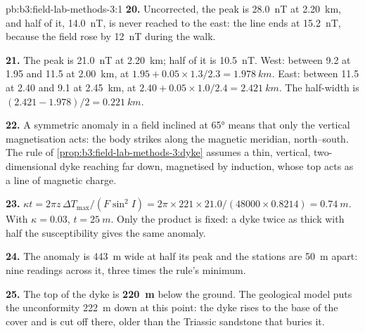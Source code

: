\begin{solution}{pb:b3:field-lab-methods-3:1}
\textbf{20.} Uncorrected, the peak is \qty{28.0}{nT} at \qty{2.20}{km}, and
half of it, \qty{14.0}{nT}, is never reached to the east: the line ends
at \qty{15.2}{nT}, because the field rose by \qty{12}{nT} during the
walk.

\textbf{21.} The peak is \qty{21.0}{nT} at \qty{2.20}{km}; half of it is
\qty{10.5}{nT}. West: between \num{9.2} at \num{1.95} and \num{11.5} at
\qty{2.00}{km}, at $1.95 + 0.05\times1.3/2.3 = \qty{1.978}{km}$. East:
between \num{11.5} at \num{2.40} and \num{9.1} at \qty{2.45}{km}, at
$2.40 + 0.05\times1.0/2.4 = \qty{2.421}{km}$. The half-width is $(2.421
- 1.978)/2 = \qty{0.221}{km}$.

\textbf{22.} A symmetric anomaly in a field inclined at \ang{65} means that only
the vertical magnetisation acts: the body strikes along the magnetic
meridian, north--south. The rule of
\cref{prop:b3:field-lab-methods-3:dyke} assumes a thin, vertical,
two-dimensional dyke reaching far down, magnetised by induction, whose
top acts as a line of magnetic charge.

\textbf{23.} $\kappa t = 2\pi z\,\Delta T_\mathrm{max}/(F\sin^2 I) = 2\pi\times
221\times21.0/(48000\times0.8214) = \qty{0.74}{m}$. With $\kappa =
0.03$, $t = \qty{25}{m}$. Only the product is fixed: a dyke twice as
thick with half the susceptibility gives the same anomaly.

\textbf{24.} The anomaly is \qty{443}{m} wide at half its peak and the stations
are \qty{50}{m} apart: nine readings across it, three times the rule's
minimum.

\textbf{25.} The top of the dyke is
\textbf{\qty[text-series-to-math=true]{220}{m}} below the ground. The
geological model puts the unconformity \qty{222}{m} down at this point:
the dyke rises to the base of the cover and is cut off there, older
than the Triassic sandstone that buries it.
\end{solution}
